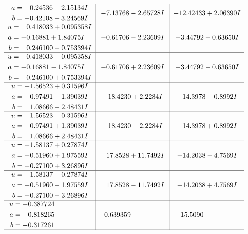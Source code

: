 \documentclass[1p]{elsarticle_modified}
\theoremstyle{definition}
\begin{document}
$$\begin{array}{c|c|c}
\begin{aligned}
a &= -0.24536 + 2.15134 I \\
b &= -0.42108 + 3.24569 I\end{aligned}
 & -7.13768 - 2.65728 I & -12.42433 + 2.06390 I \\ \hline\begin{aligned}
u &= \phantom{-}0.418033 + 0.095358 I \\
a &= -0.16881 + 1.84075 I \\
b &= \phantom{-}0.246100 - 0.753394 I\end{aligned}
 & -0.61706 - 2.23609 I & -3.44792 + 0.63650 I \\ \hline\begin{aligned}
u &= \phantom{-}0.418033 - 0.095358 I \\
a &= -0.16881 - 1.84075 I \\
b &= \phantom{-}0.246100 + 0.753394 I\end{aligned}
 & -0.61706 + 2.23609 I & -3.44792 - 0.63650 I \\ \hline\begin{aligned}
u &= -1.56523 + 0.31596 I \\
a &= \phantom{-}0.97491 - 1.39039 I \\
b &= \phantom{-}1.08666 - 2.48431 I\end{aligned}
 & \phantom{-}18.4230 + 2.2284 I & -14.3978 - 0.8992 I \\ \hline\begin{aligned}
u &= -1.56523 - 0.31596 I \\
a &= \phantom{-}0.97491 + 1.39039 I \\
b &= \phantom{-}1.08666 + 2.48431 I\end{aligned}
 & \phantom{-}18.4230 - 2.2284 I & -14.3978 + 0.8992 I \\ \hline\begin{aligned}
u &= -1.58137 + 0.27874 I \\
a &= -0.51960 + 1.97559 I \\
b &= -0.27100 + 3.26896 I\end{aligned}
 & \phantom{-}17.8528 + 11.7492 I & -14.2038 - 4.7569 I \\ \hline\begin{aligned}
u &= -1.58137 - 0.27874 I \\
a &= -0.51960 - 1.97559 I \\
b &= -0.27100 - 3.26896 I\end{aligned}
 & \phantom{-}17.8528 - 11.7492 I & -14.2038 + 4.7569 I \\ \hline\begin{aligned}
u &= -0.387724\phantom{ +0.000000I} \\
a &= -0.818265\phantom{ +0.000000I} \\
b &= -0.317261\phantom{ +0.000000I}\end{aligned}
 & -0.639359\phantom{ +0.000000I} & -15.5090\phantom{ +0.000000I}\\
 \hline 
 \end{array}$$\newpage\newpage\renewcommand{\arraystretch}{1}
\end{document}
